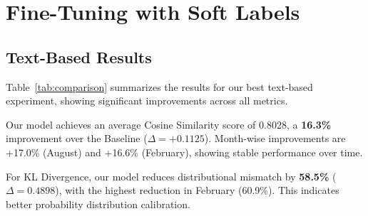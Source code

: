 \section{Fine-Tuning with Soft Labels}
\subsection{Text-Based Results}
\label{sec:text-results}

Table~\ref{tab:comparison} summarizes the results for our best text-based experiment, showing significant improvements across all metrics.
\newline

\begin{table}[ht]
    \centering
    \caption{Performance comparison between Baseline and Our Model. The Baseline is the CardiffNLP RoBERTa-Large. Higher values are better for $\uparrow$, and lower values are better for $\downarrow$. Bold values indicate averaged scores.}
    \label{tab:comparison}
\end{table}

Our model achieves an average Cosine Similarity score of 0.8028, a \textbf{16.3\%} improvement over the Baseline ($\Delta = +0.1125$). Month-wise improvements are +17.0\% (August) and +16.6\% (February), showing stable performance over time.
\newline

For KL Divergence, our model reduces distributional mismatch by \textbf{58.5\%} ($\Delta = 0.4898$), with the highest reduction in February (60.9\%). This indicates better probability distribution calibration.
\newline

